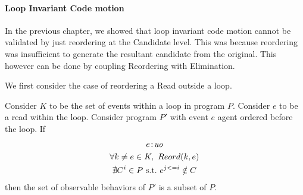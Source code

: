         \paragraph{Loop Invariant Code motion}  

            In the previous chapter, we showed that loop invariant code motion cannot be validated by just reordering at the Candidate level. 
            This was because reordering was insufficient to generate the resultant candidate from the original. 
            This however can be done by coupling Reordering with Elimination. 
            
            We first consider the case of reordering a Read outside a loop.
            \begin{corollary}
                \label{LoopInvCodeMotRead1}
                Consider $K$ to be the set of events within a loop in program $P$. Consider $e$ to be a read within the loop. Consider program $P'$ with event $e$ agent ordered before the loop. If
                \begin{gather*}
                    e\!:\!\textit{uo} \\
                    \forall k \neq e \in K, \ Reord(k, e) \\ 
                    \nexists C^i \in P \ \text{s.t.} \ e^{j<=i} \notin C                      
                \end{gather*}
                then the set of observable behaviors of $P'$ is a subset of $P$.
            \end{corollary}
            
